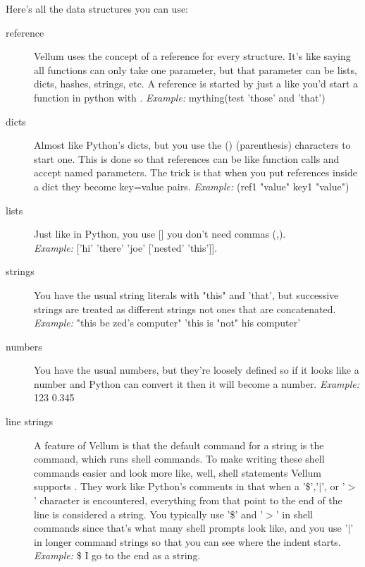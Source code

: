 Here's all the data structures you can use:

\begin{description}
\item[reference]  Vellum uses the concept of a reference for every structure.
    It's like saying all functions can only take one parameter, but that parameter
    can be lists, dicts, hashes, strings, etc.  A reference is started by just a
     like you'd start a function in python with .
    \emph{Example:} mything(test 'those' and 'that')

\item[dicts] Almost like Python's dicts, but you use the () (parenthesis)
            characters to start one.  This is done so that references 
            can be like function calls and accept named
            parameters.  The trick is that when you put references inside
            a dict they become key=value pairs.
            \emph{Example:} (ref1 "value" key1 "value") 

\item[lists] Just like in Python, you use [] you don't need commas (,).\\
            \emph{Example:} ['hi' 'there' 'joe' ['nested' 'this']].

\item[strings] You have the usual string literals with "this" and 'that', but
    successive strings are treated as different strings not ones that are
    concatenated.
    \emph{Example:} "this be zed's computer" 'this is "not" his computer'

\item[numbers] You have the usual numbers, but they're loosely defined so if it
        looks like a number and Python can convert it then it will become a number.
        \emph{Example:} 123 0.345

\item[line strings]  A feature of Vellum is that the default command for a
    string is the  command, which runs shell commands.  To make
    writing these shell commands easier and look more like, well, shell
    statements Vellum supports .  They work like Python's
    comments in that when a '\$','$|$', or '$>$' character is encountered,
    everything from that point to the end of the line is considered a string.
    You typically use '\$' and '$>$' in shell commands since that's what many
    shell prompts look like, and you use '$|$' in longer  command
    strings so that you can see where the indent starts.
    \emph{Example:} \$ I go to the end as a string.

\end{description}

